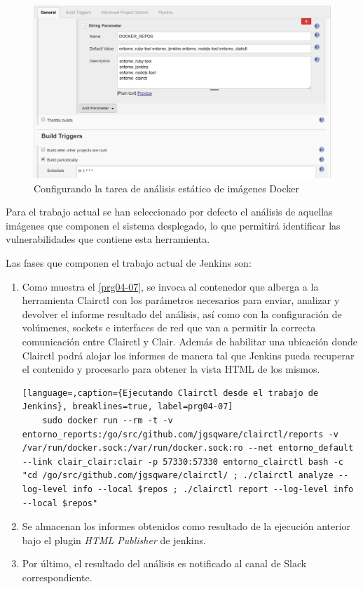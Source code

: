 \begin{figure}[htbp]
	\centering
	\includegraphics[width=0.90\linewidth]
	{desarrollo/figuras/docker_01.png}
	\caption{Configurando la tarea de análisis estático de imágenes Docker}
	\label{docker_01}
\end{figure}

Para el trabajo actual se han seleccionado por defecto el análisis de aquellas imágenes que componen el sistema desplegado, lo que permitirá identificar las vulnerabilidades que contiene esta herramienta.

Las fases que componen el trabajo actual de Jenkins son:

\begin{enumerate}
	\item Como muestra el \autoref{prg04-07}, se invoca al contenedor que alberga a la herramienta Clairctl con los parámetros necesarios para enviar, analizar y devolver el informe resultado del análisis, así como con la configuración de volúmenes, sockets e interfaces de red que van a permitir la correcta comunicación entre Clairctl y Clair. Además de habilitar una ubicación donde Clairctl podrá alojar los informes de manera tal que Jenkins pueda recuperar el contenido y procesarlo para obtener la vista HTML de los mismos.
	\begin{lstlisting}[language=,caption={Ejecutando Clairctl desde el trabajo de Jenkins}, breaklines=true, label=prg04-07]
	sudo docker run --rm -t -v entorno_reports:/go/src/github.com/jgsqware/clairctl/reports -v /var/run/docker.sock:/var/run/docker.sock:ro --net entorno_default --link clair_clair:clair -p 57330:57330 entorno_clairctl bash -c "cd /go/src/github.com/jgsqware/clairctl/ ; ./clairctl analyze --log-level info --local $repos ; ./clairctl report --log-level info --local $repos"
	\end{lstlisting}
	\item Se almacenan los informes obtenidos como resultado de la ejecución anterior bajo el plugin \textit{HTML Publisher} de jenkins.
	\item Por último, el resultado del análisis es notificado al canal de Slack correspondiente. 
\end{enumerate}

